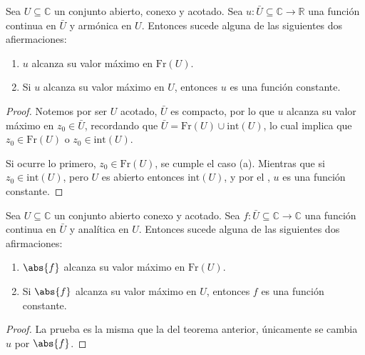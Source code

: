 \documentclass[../main.tex]{subfiles}
\begin{document}
\begin{theorem}
    Sea \(U \subseteq \mathbb{C}\) un conjunto abierto, conexo y acotado. Sea \( u
    \colon \bar{U} \subseteq \mathbb{C}  \to \mathbb{R}\) una función continua en
    \(\bar{U}\) y armónica en \(U\). Entonces sucede alguna de las siguientes dos
    afiermaciones:

    \begin{enumerate}
        \item \(u\) alcanza su valor máximo en \(\mathrm{Fr}(U)\).
        \item Si \(u\) alcanza su valor máximo en \(U\), entonces \(u\) es una función
            constante.
    \end{enumerate}
\end{theorem}

\begin{proof}
    Notemos por ser \(U\) acotado, \(\bar{U}\) es compacto, por lo que \(u\) alcanza su
    valor máximo en \(z_{0}\in \bar{U}\), recordando que \(\bar{U} = \mathrm{Fr}(U) \cup
    \mathrm{int}(U)\), lo cual implica que \(z_{0}\in \mathrm{Fr}(U)\) o \(z_{0}\in
    \mathrm{int}(U)\).

    Si ocurre lo primero, \(z_{0}\in \mathrm{Fr}(U)\), se cumple el caso (a).
    Mientras que si \(z_{0}\in
    \mathrm{int}(U)\), pero \(U\) es abierto entonces \(\mathrm{int}(U)\), y por el
    , \(u\) es una
    función constante.
\end{proof}

\begin{theorem}
    Sea \(U \subseteq \mathbb{C}\) un conjunto abierto conexo y acotado. Sea \(f \colon
    \bar{U} \subseteq \mathbb{C}\to \mathbb{C}\) una función continua en \(\bar{U}\) y
    analítica en \(U\). Entonces sucede alguna de las siguientes dos afirmaciones:

    \begin{enumerate}
        \item \(\abs{f}\) alcanza su valor máximo en \(\mathrm{Fr}(U)\).
        \item Si \(\abs{f}\) alcanza su valor máximo en \(U\), entonces \(f\)
            es una función
            constante.
    \end{enumerate}
\end{theorem}

\begin{proof}
    La prueba es la misma que la del teorema anterior, únicamente se cambia \(u\) por
    \(\abs{f}\).
\end{proof}
\end{document}
